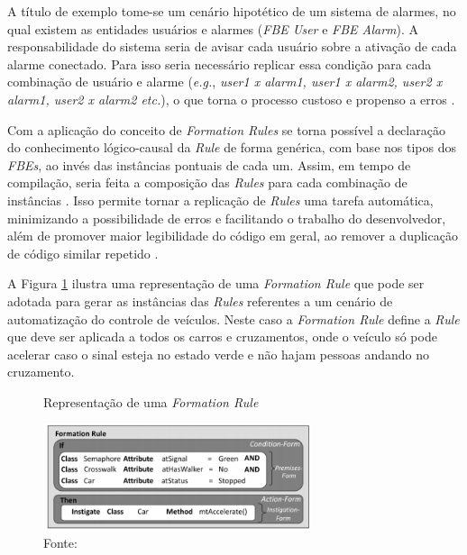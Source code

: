 A título de exemplo tome-se um cenário hipotético de um sistema de alarmes, no
qual existem as entidades usuários e alarmes (\textit{FBE User} e \textit{FBE
Alarm}). A responsabilidade do sistema seria de avisar cada usuário sobre a
ativação de cada alarme conectado. Para isso seria necessário replicar essa
condição para cada combinação de usuário e alarme (\textit{e.g.}, \textit{user1
x alarm1, user1 x alarm2, user2 x alarm1, user2 x alarm2 etc.}), o que torna o
processo custoso e propenso a erros \cite{doc_ronszcka_2019}.

Com a aplicação do conceito de \textit{Formation Rules} se torna possível a
declaração do conhecimento lógico-causal da \textit{Rule} de forma genérica, com
base nos tipos dos \textit{FBEs}, ao invés das instâncias pontuais de cada um.
Assim, em tempo de compilação, seria feita a composição das \textit{Rules} para
cada combinação de instâncias \cite{doc_ronszcka_2019}. Isso permite tornar a
replicação de \textit{Rules} uma tarefa automática, minimizando a possibilidade
de erros e facilitando o trabalho do desenvolvedor, além de promover maior
legibilidade do código em geral, ao remover a duplicação de código similar
repetido \cite{doc_ronszcka_2019}.

A Figura \ref{fig:formation_rule} ilustra uma representação de uma
\textit{Formation Rule} que pode ser adotada para gerar as instâncias das
\textit{Rules} referentes a um cenário de automatização do controle de veículos.
Neste caso a \textit{Formation Rule} define a \textit{Rule} que deve ser
aplicada a todos os carros e cruzamentos, onde o veículo só pode acelerar caso o
sinal esteja no estado verde e não hajam pessoas andando no cruzamento.

\begin{figure}[!htb]
  \centering
  \caption{Representação de uma \textit{Formation Rule}}
  \includegraphics[width=0.7\textwidth]{../figures/formation_rule.png}
  \smallskip
  \caption*{Fonte: }
  \label{fig:formation_rule}
\end{figure}


